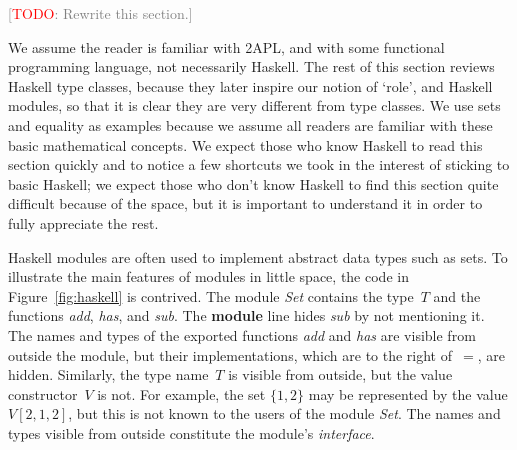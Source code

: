 \documentclass[conference,compsoc]{IEEEtran} %
\newcommand{\todo}[1]{{\small \textcolor{gray}{[\textcolor{red}{TODO}: #1]}}}
\begin{document}
\todo{Rewrite this section.}

We assume the reader is familiar with 2APL, and with some functional
programming language, not necessarily Haskell.  The rest of this section
reviews Haskell type classes, because they later inspire our notion of
`role', and Haskell modules, so that it is clear they are very different
from type classes. We use sets and equality as examples because we assume
all readers are familiar with these basic mathematical concepts. We expect
those who know Haskell to read this section quickly and to notice a few
shortcuts we took in the interest of sticking to basic Haskell; we expect
those who don't know Haskell to find this section quite difficult because
of the space, but it is important to understand it in order to fully
appreciate the rest.




Haskell modules are often used to implement abstract data types such as
sets.  To illustrate the main features of modules in little space, the code
in Figure~\ref{fig:haskell} is contrived.  The module \textit{Set} contains
the type~$T$ and the functions \textit{add}, \textit{has}, and
\textit{sub}. The \textbf{module} line hides \textit{sub} by not mentioning
it. The names and types of the exported functions \textit{add} and
\textit{has} are visible from outside the module, but their
implementations, which are to the right of~$=$, are hidden.  Similarly, the
type name~$T$ is visible from outside, but the value constructor~$V$ is
not. For example, the set $\{1,2\}$ may be represented by the value
$V[2,1,2]$, but this is not known to the users of the module \textit{Set}.
The names and types visible from outside constitute the module's
\emph{interface}.
\end{document}
